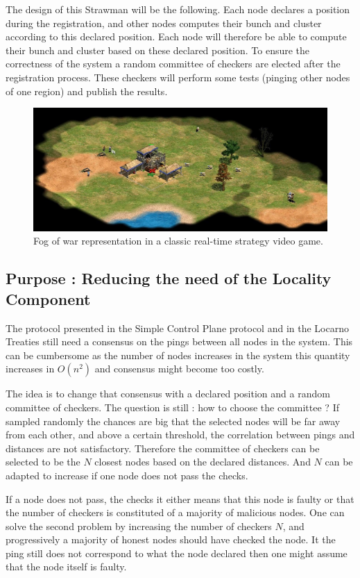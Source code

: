 \documentclass[a4paper,11pt,oneside]{report}
\begin{document}
The design of this Strawman will be the following. Each node declares a
position during the registration, and other nodes computes their bunch and
cluster according to this declared position. Each node will therefore be able
to compute their bunch and cluster based on these declared position. To ensure
the correctness of the system a random committee of checkers are elected after
the registration process. These checkers will perform some tests (pinging other
nodes of one region) and publish the results. 

\begin{figure}[!h] 
\centering
\includegraphics[width=400pt]{figures/fog_of_war}
\caption{Fog of war representation in a classic real-time strategy video game. }
\label{fig:registrationprotocol}
\end{figure}

\subsection{Purpose : Reducing the need of the Locality Component}
The protocol presented in the Simple Control Plane protocol and in the Locarno
Treaties still need a consensus on the pings between all nodes in the system.
This can be cumbersome as the number of nodes increases in the system this
quantity increases in $O(n^2)$ and consensus might become too costly. 

The idea is to change that consensus with a declared position and a random
committee of checkers. The question is still : how to choose the committee ? If
sampled randomly the chances are big that the selected nodes will be far away
from each other, and above a certain threshold, the correlation between pings
and distances are not satisfactory. Therefore the committee of checkers can be
selected to be the $N$ closest nodes based on the declared distances. And $N$
can be adapted to increase if one node does not pass the checks. 

If a node does not pass, the checks it either means that this node is faulty or
that the number of checkers is constituted of a majority of malicious nodes.
One can solve the second problem by increasing the number of checkers $N$, and
progressively a majority of honest nodes should have checked the node. It the
ping still does not correspond to what the node declared then one might assume
that the node itself is faulty. 
\end{document}
